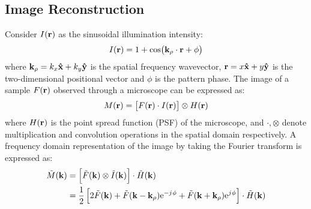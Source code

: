 \documentclass[11pt]{article}
\begin{document}
\subsection{Image Reconstruction}
%
Consider $I(\mathbf{r})$ as the sinusoidal illumination intensity:
%
\begin{equation}
  I(\mathbf{r}) = 1 + \cos(\mathbf{k}_{\rho} \cdot \mathbf{r} + \phi)
  \label{eq:intensity}
\end{equation}
where $\mathbf{k}_{\rho} = k_x \mathbf{\hat{x}} + k_y \mathbf{\hat{y}}$ is the spatial frequency wavevector,  $\mathbf{r} = x \mathbf{\hat{x}} +  y \mathbf{\hat{y}}$ is the two-dimensional positional vector and $\phi$ is the pattern phase. The image of a sample $F(\mathbf{r})$ observed through a microscope can be expressed as:
%
\begin{equation}
  M(\mathbf{r}) = \left[ F(\mathbf{r}) \cdot I(\mathbf{r}) \right] \otimes H(\mathbf{r})
  \label{eq:m_spatial_image}
\end{equation}
%
where $H(\mathbf{r})$ is the point spread function (PSF) of the microscope, and $\cdot, \otimes$ denote multiplication and convolution operations in the spatial domain respectively. A frequency domain representation of the image by taking the Fourier transform is expressed as:
%
\begin{equation}
  \begin{split}
    \tilde{M}(\mathbf{k}) &= \left[ \tilde{F}(\mathbf{k}) \otimes \tilde{I}(\mathbf{k}) \right] \cdot \tilde{H}(\mathbf{k}) \\
     &= \frac{1}{2} \left[ 2\tilde{F}(\mathbf{k}) + \tilde{F}(\mathbf{k} - \mathbf{k}_{\rho}) \mathrm{e}^{- j\mkern1mu \phi} + \tilde{F}(\mathbf{k} + \mathbf{k}_{\rho}) \mathrm{e}^{j\mkern1mu \phi} \right] \cdot \tilde{H}(\mathbf{k})
  \end{split}
  \label{eq:m_ft}
\end{equation}
\end{document}
